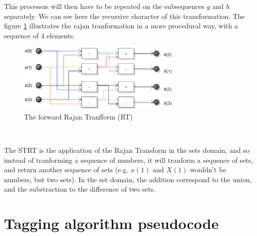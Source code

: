 This processus will then have to be repeated on the subsequences $g$ and $h$ separately. We can see here the recursive character of this transformation. The figure \ref{fig:diagram:flowchart:rajan} illustrates the rajan tranformation in a more procedural way, with a sequence of 4 elements. 

\begin{figure}[ht]
	\centering
	\includegraphics[width=0.7\textwidth]{images/diagrams/flowchart_rajan_transform}
	\caption{The forward Rajan Tranfform (RT)}
	\label{fig:diagram:flowchart:rajan}	
\end{figure}

~~

The \gls{STRT} is the application of the Rajan Transform in the sets domain, and so instead of tranforming a sequence of numbers, it will tranform a sequence of sets, and return another sequence of sets (e.g. $x(1)$ and $X(1)$ wouldn't be numbers, but two sets). In the set domain, the addition correspond to the union, and the substraction to the difference of two sets.



\section{Tagging algorithm pseudocode}


